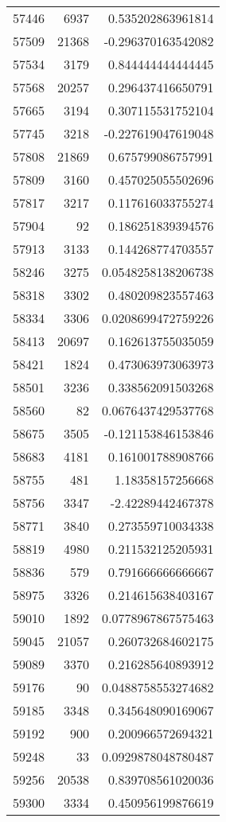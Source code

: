 \begin{tabular}{r | r | r}
57446 & 6937 & 0.535202863961814 \\
57509 & 21368 & -0.296370163542082 \\
57534 & 3179 & 0.844444444444445 \\
57568 & 20257 & 0.296437416650791 \\
57665 & 3194 & 0.307115531752104 \\
57745 & 3218 & -0.227619047619048 \\
57808 & 21869 & 0.675799086757991 \\
57809 & 3160 & 0.457025055502696 \\
57817 & 3217 & 0.117616033755274 \\
57904 & 92 & 0.186251839394576 \\
57913 & 3133 & 0.144268774703557 \\
58246 & 3275 & 0.0548258138206738 \\
58318 & 3302 & 0.480209823557463 \\
58334 & 3306 & 0.0208699472759226 \\
58413 & 20697 & 0.162613755035059 \\
58421 & 1824 & 0.473063973063973 \\
58501 & 3236 & 0.338562091503268 \\
58560 & 82 & 0.0676437429537768 \\
58675 & 3505 & -0.121153846153846 \\
58683 & 4181 & 0.161001788908766 \\
58755 & 481 & 1.18358157256668 \\
58756 & 3347 & -2.42289442467378 \\
58771 & 3840 & 0.273559710034338 \\
58819 & 4980 & 0.211532125205931 \\
58836 & 579 & 0.791666666666667 \\
58975 & 3326 & 0.214615638403167 \\
59010 & 1892 & 0.0778967867575463 \\
59045 & 21057 & 0.260732684602175 \\
59089 & 3370 & 0.216285640893912 \\
59176 & 90 & 0.0488758553274682 \\
59185 & 3348 & 0.345648090169067 \\
59192 & 900 & 0.200966572694321 \\
59248 & 33 & 0.0929878048780487 \\
59256 & 20538 & 0.839708561020036 \\
59300 & 3334 & 0.450956199876619 \\

\end{tabular}
